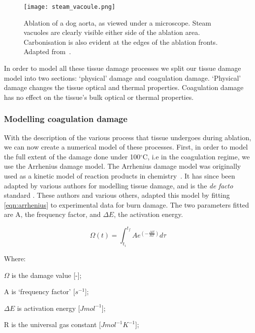 \begin{figure}	
\vspace{-10pt}
	\centering
	\texttt{[image: steam\_vacoule.png]}
	\caption{Ablation of a dog aorta, as viewed under a microscope. Steam vacuoles are clearly visible either side of the ablation area. Carbonisation is also evident at the edges of the ablation fronts. Adapted from~\cite{welch2011optical}.}
	\label{fig:histology}
	\vspace{-10pt}
\end{figure}

In order to model all these tissue damage processes we split our tissue damage model into two sections: `physical' damage and coagulation damage. `Physical' damage changes the tissue optical and thermal properties. Coagulation damage has no effect on the tissue's bulk optical or thermal properties.

\subsubsection*{Modelling coagulation damage}\label{sec:coagdamage}
With the description of the various process that tissue undergoes during ablation, we can now create a numerical model of these processes.
First, in order to model the full extent of the damage done under 100${^{\circ}}$C, i.e in the coagulation regime, we use the Arrhenius damage model. The Arrhenius damage model was originally used as a kinetic model of reaction products in chemistry~\cite{pearce2009relationship}. It has since been adapted by various authors for modelling tissue damage, and is the \textit{de facto} standard \cite{hendriques1947studies,jiang2002effects}. These authors and various others, adapted this model by fitting \cref{eqn:arrhenius} to experimental data for burn damage. The two parameters fitted are A, the frequency factor, and $\Delta E$, the activation energy.

\begin{equation}
\Omega(t)=\int^{t_{f}}_{t_i} Ae^{(-\tfrac{\Delta E}{RT})}d\tau
\label{eqn:arrhenius}
\end{equation}


\noindent Where:

	\indent $\Omega$ is the damage value [-];
	
	\indent A is `frequency factor' [$s^{-1}$];
	
	\indent $\Delta E$ is activation energy [$J mol^{-1}$];
	
	\indent R is the universal gas constant [$J mol^{-1} K^{-1}$];
	

